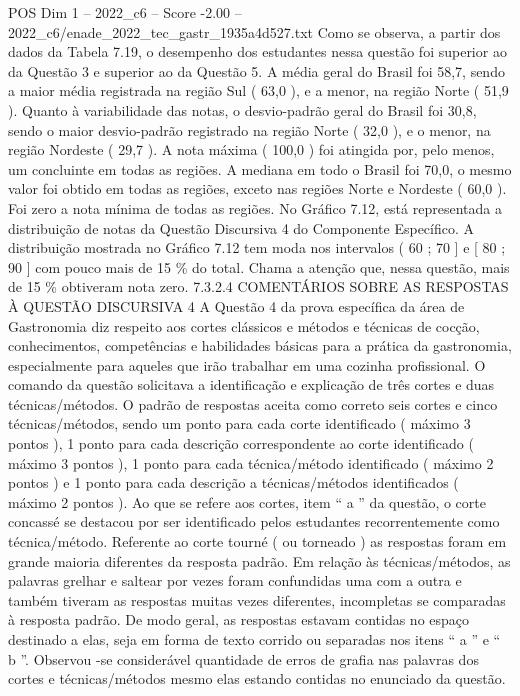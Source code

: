 \begin{textsample}{POS Dim 1 – 2022\_c6 – Score -2.00 – 2022\_c6/enade\_2022\_tec\_gastr\_1935a4d527.txt}
Como se observa, a partir dos dados da Tabela 7.19, o desempenho dos estudantes nessa questão foi superior ao da Questão 3 e superior ao da Questão 5.
A média geral do Brasil foi 58,7, sendo a maior média registrada na região Sul ( 63,0 ), e a menor, na região Norte ( 51,9 ).
Quanto à variabilidade das notas, o desvio-padrão geral do Brasil foi 30,8, sendo o maior desvio-padrão registrado na região Norte ( 32,0 ), e o menor, na região Nordeste ( 29,7 ).
A nota máxima ( 100,0 ) foi atingida por, pelo menos, um concluinte em todas as regiões.
A mediana em todo o Brasil foi 70,0, o mesmo valor foi obtido em todas as regiões, exceto nas regiões Norte e Nordeste ( 60,0 ).
Foi zero a nota mínima de todas as regiões.
No Gráfico 7.12, está representada a distribuição de notas da Questão Discursiva 4 do Componente Específico.
A distribuição mostrada no Gráfico 7.12 tem moda nos intervalos ( 60 ; 70 ] e [ 80 ; 90 ] com pouco mais de 15 \% do total.
Chama a atenção que, nessa questão, mais de 15 \% obtiveram nota zero. 7.3.2.4 COMENTÁRIOS SOBRE AS RESPOSTAS À QUESTÃO DISCURSIVA 4 A Questão 4 da prova específica da área de Gastronomia diz respeito aos cortes clássicos e métodos e técnicas de cocção, conhecimentos, competências e habilidades básicas para a prática da gastronomia, especialmente para aqueles que irão trabalhar em uma cozinha profissional.
O comando da questão solicitava a identificação e explicação de três cortes e duas técnicas/métodos.
O padrão de respostas aceita como correto seis cortes e cinco técnicas/métodos, sendo um ponto para cada corte identificado ( máximo 3 pontos ), 1 ponto para cada descrição correspondente ao corte identificado ( máximo 3 pontos ), 1 ponto para cada técnica/método identificado ( máximo 2 pontos ) e 1 ponto para cada descrição a técnicas/métodos identificados ( máximo 2 pontos ).
Ao que se refere aos cortes, item “ a ” da questão, o corte concassé se destacou por ser identificado pelos estudantes recorrentemente como técnica/método.
Referente ao corte tourné ( ou torneado ) as respostas foram em grande maioria diferentes da resposta padrão.
Em relação às técnicas/métodos, as palavras grelhar e saltear por vezes foram confundidas uma com a outra e também tiveram as respostas muitas vezes diferentes, incompletas se comparadas à resposta padrão.
De modo geral, as respostas estavam contidas no espaço destinado a elas, seja em forma de texto corrido ou separadas nos itens “ a ” e “ b ”.
Observou -se considerável quantidade de erros de grafia nas palavras dos cortes e técnicas/métodos mesmo elas estando contidas no enunciado da questão.

\end{textsample}
